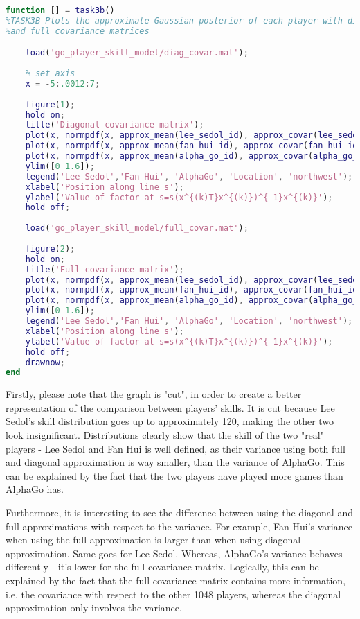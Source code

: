 \documentclass[a4paper,11pt]{article}
\theoremstyle{mytheor}
\begin{document}
\begin{lstlisting}[label={list:3b},caption=Code for plotting approximate marginal posterior using full and diagonal approximations,language=MATLAB]
function [] = task3b()
%TASK3B Plots the approximate Gaussian posterior of each player with diagonal
%and full covariance matrices

    load('go_player_skill_model/diag_covar.mat');
    
    % set axis
    x = -5:.0012:7;
    
    figure(1);
    hold on;
    title('Diagonal covariance matrix');
    plot(x, normpdf(x, approx_mean(lee_sedol_id), approx_covar(lee_sedol_id)),'-r');
    plot(x, normpdf(x, approx_mean(fan_hui_id), approx_covar(fan_hui_id)),'--g');
    plot(x, normpdf(x, approx_mean(alpha_go_id), approx_covar(alpha_go_id)),'-.b');
    ylim([0 1.6]);
    legend('Lee Sedol','Fan Hui', 'AlphaGo', 'Location', 'northwest');
    xlabel('Position along line s');
    ylabel('Value of factor at s=s(x^{(k)T}x^{(k)})^{-1}x^{(k)}');
    hold off;
    
    load('go_player_skill_model/full_covar.mat');
    
    figure(2);
    hold on;
    title('Full covariance matrix');
    plot(x, normpdf(x, approx_mean(lee_sedol_id), approx_covar(lee_sedol_id,lee_sedol_id)),'-r');
    plot(x, normpdf(x, approx_mean(fan_hui_id), approx_covar(fan_hui_id,fan_hui_id)),'--g');
    plot(x, normpdf(x, approx_mean(alpha_go_id), approx_covar(alpha_go_id,alpha_go_id)),'-.b');
    ylim([0 1.6]);
    legend('Lee Sedol','Fan Hui', 'AlphaGo', 'Location', 'northwest');
    xlabel('Position along line s');
    ylabel('Value of factor at s=s(x^{(k)T}x^{(k)})^{-1}x^{(k)}');
    hold off;
    drawnow;
end

\end{lstlisting}

Firstly, please note that the graph is "cut", in order to create a better representation of the comparison between players' skills. It is cut because Lee Sedol's skill distribution goes up to approximately 120, making the other two look insignificant. Distributions clearly show that the skill of the two "real" players - Lee Sedol and Fan Hui is well defined, as their variance using both full and diagonal approximation is way smaller, than the variance of AlphaGo. This can be explained by the fact that the two players have played more games than AlphaGo has.

Furthermore, it is interesting to see the difference between using the diagonal and full approximations with respect to the variance. For example, Fan Hui's variance when using the full approximation is larger than when using diagonal approximation. Same goes for Lee Sedol. Whereas, AlphaGo's variance behaves differently - it's lower for the full covariance matrix. Logically, this can be explained by the fact that the full covariance matrix contains more information, i.e. the covariance with respect to the other 1048 players, whereas the diagonal approximation only involves the variance.
\end{document}
